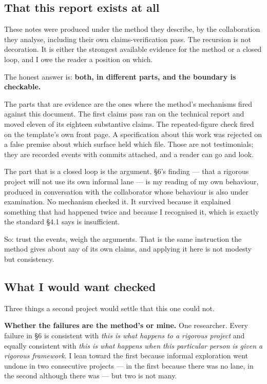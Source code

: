 \subsection{That this report exists at all}

These notes were produced under the method they describe, by the collaboration they analyse, including their own claims-verification pass. The recursion is not decoration. It is either the strongest available evidence for the method or a closed loop, and I owe the reader a position on which.

The honest answer is: \textbf{both, in different parts, and the boundary is checkable.}

The parts that are evidence are the ones where the method's mechanisms fired against this document. The first claims pass ran on the technical report and moved eleven of its eighteen substantive claims. The repeated-figure check fired on the template's own front page. A specification about this work was rejected on a false premise about which surface held which file. Those are not testimonials; they are recorded events with commits attached, and a reader can go and look.

The part that is a closed loop is the argument. \S6's finding --- that a rigorous project will not use its own informal lane --- is my reading of my own behaviour, produced in conversation with the collaborator whose behaviour is also under examination. No mechanism checked it. It survived because it explained something that had happened twice and because I recognised it, which is exactly the standard \S4.1 says is insufficient.

So: trust the events, weigh the arguments. That is the same instruction the method gives about any of its own claims, and applying it here is not modesty but consistency.

\subsection{What I would want checked}

Three things a second project would settle that this one could not.

\textbf{Whether the failures are the method's or mine.} One researcher. Every failure in \S6 is consistent with \textit{this is what happens to a rigorous project} and equally consistent with \textit{this is what happens when this particular person is given a rigorous framework}. I lean toward the first because informal exploration went undone in two consecutive projects --- in the first because there was no lane, in the second although there was --- but two is not many.

